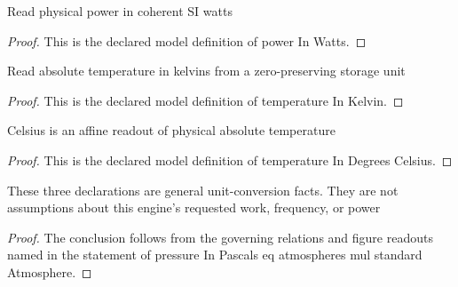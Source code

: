 \begin{definition}
  \label{def:physics:phyx-mini-0426:phyxminiproblems-problemphyxmini0426-powerinwatts}
  Read physical power in coherent SI watts
\end{definition}
\begin{proof}
  This is the declared model definition of power In Watts.
\end{proof}
\begin{definition}
  \label{def:physics:phyx-mini-0426:phyxminiproblems-problemphyxmini0426-temperatureinkelvin}
  Read absolute temperature in kelvins from a zero-preserving storage unit
\end{definition}
\begin{proof}
  This is the declared model definition of temperature In Kelvin.
\end{proof}
\begin{definition}
  \label{def:physics:phyx-mini-0426:phyxminiproblems-problemphyxmini0426-temperatureindegreescelsius}
  Celsius is an affine readout of physical absolute temperature
\end{definition}
\begin{proof}
  This is the declared model definition of temperature In Degrees Celsius.
\end{proof}
\begin{lemma}
  \label{lem:physics:phyx-mini-0426:phyxminiproblems-problemphyxmini0426-pressureinpascals-eq-atmospheres-mul-standardatmosphere}
  These three declarations are general unit-conversion facts. They are not assumptions about this engine's requested work, frequency, or power
\end{lemma}
\begin{proof}
  The conclusion follows from the governing relations and figure readouts named in the statement of pressure In Pascals eq atmospheres mul standard Atmosphere.
\end{proof}
